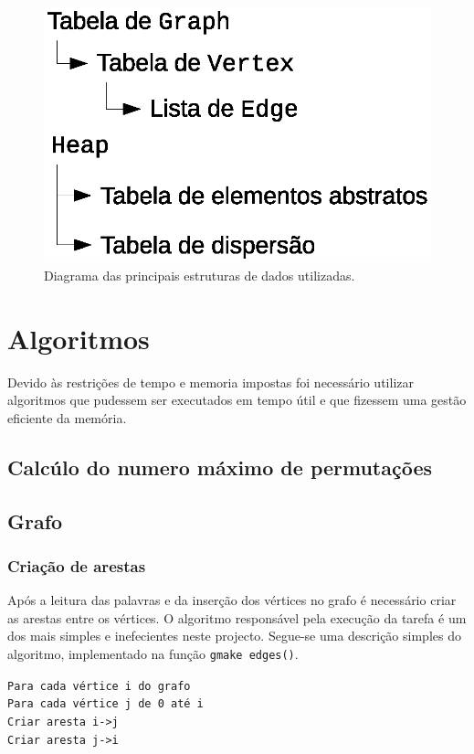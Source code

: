 \documentclass[portuguese, a4paper]{article}
\newcommand\tu[0]{\textunderscore}
\begin{document}
	\begin{figure}[H]
		\centering
		\includegraphics[width=0.4\linewidth]{data}
		\caption{Diagrama das principais estruturas de dados utilizadas.}
	\end{figure}


\section{Algoritmos}
\label{sec:algoritmos}
	\par
	Devido às restrições de tempo e memoria impostas foi
	necessário utilizar algoritmos que pudessem ser executados em tempo útil e
	que fizessem uma gestão eficiente da memória.

	\subsection{Calcúlo do numero máximo de permutações}
	\par
	\texttt{}
	\subsection{Grafo}
	\subsubsection{Criação de arestas}
	\par
	Após a leitura das palavras e da inserção dos vértices no grafo é necessário
	criar as arestas entre os vértices. O algoritmo responsável pela execução
	da tarefa é um dos mais simples e inefecientes neste projecto. Segue-se uma
	descrição simples do algoritmo, implementado na função \texttt{g\tu make\tu
	edges()}.

	\par\null\par
	\texttt{Para cada vértice i do grafo}\\
	\indent\indent\texttt{Para cada vértice j de 0 até i}\\
	\indent\indent\indent\texttt{Criar aresta i->j}\\
	\indent\indent\indent\texttt{Criar aresta j->i}\\
\end{document}
